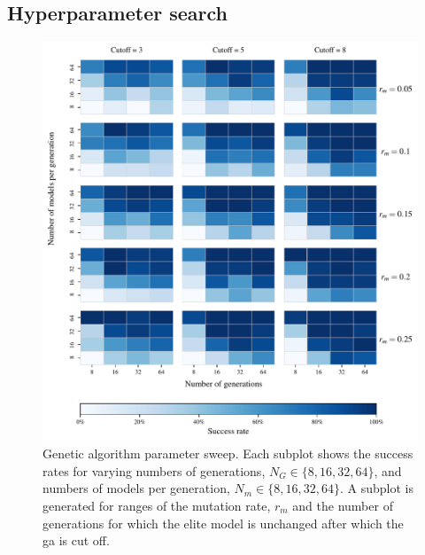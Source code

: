 \subsection{Hyperparameter search}
\label{sec:hyperparameter}
\begin{figure}
    \begin{center}
        \includegraphics{theoretical_study/figures/gen_alg_param_sweep.pdf}
    \end{center}
    \caption[Genetic algorithm parameter sweep]{
        Genetic algorithm parameter sweep.
        Each subplot shows the success rates for varying numbers of generations, $N_G \in \{8, 16, 32, 64\}$, 
        and numbers of models per generation, $N_m \in \{8, 16, 32, 64\}$. 
        A subplot is generated for ranges of the mutation rate, $r_m$ and the number of 
        generations for which the elite model is unchanged after which the \gls{ga} is cut off.
        \figtableref 
    }
    \label{fig:ga_param_sweep}
\end{figure}

